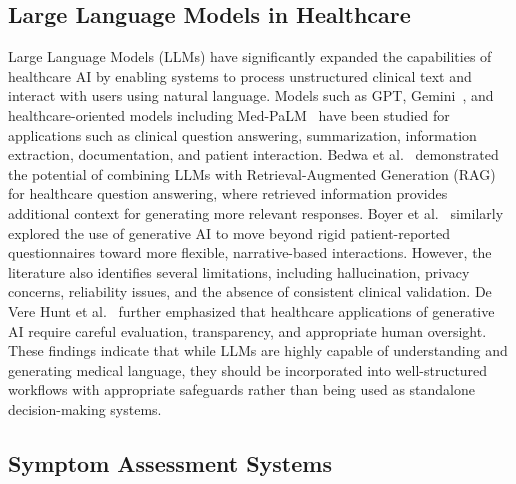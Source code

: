 \documentclass[conference]{IEEEtran}
\begin{document}
\subsection{Large Language Models in Healthcare}

Large Language Models (LLMs) have significantly expanded the capabilities of healthcare AI by enabling systems to process unstructured clinical text and interact with users using natural language. Models such as GPT, Gemini~\cite{gemini2023}, and healthcare-oriented models including Med-PaLM~\cite{singhal2023} have been studied for applications such as clinical question answering, summarization, information extraction, documentation, and patient interaction. Bedwa et al.~\cite{bedwa2026} demonstrated the potential of combining LLMs with Retrieval-Augmented Generation (RAG) for healthcare question answering, where retrieved information provides additional context for generating more relevant responses. Boyer et al.~\cite{boyer2025} similarly explored the use of generative AI to move beyond rigid patient-reported questionnaires toward more flexible, narrative-based interactions. However, the literature also identifies several limitations, including hallucination, privacy concerns, reliability issues, and the absence of consistent clinical validation. De Vere Hunt et al.~\cite{devere2025} further emphasized that healthcare applications of generative AI require careful evaluation, transparency, and appropriate human oversight. These findings indicate that while LLMs are highly capable of understanding and generating medical language, they should be incorporated into well-structured workflows with appropriate safeguards rather than being used as standalone decision-making systems.

\subsection{Symptom Assessment Systems}
\end{document}
